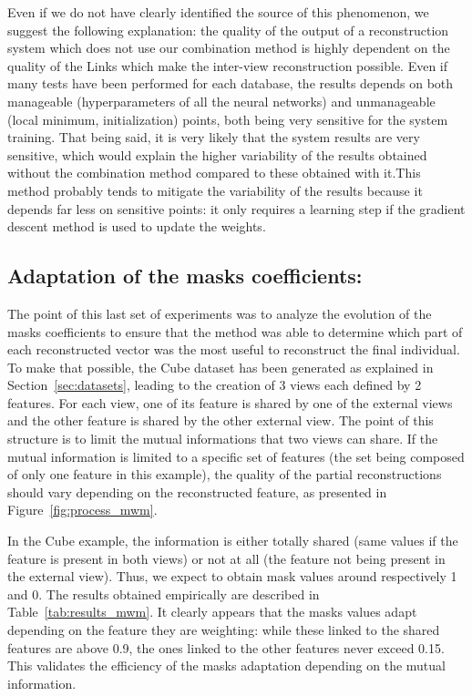 Even if we do not have clearly identified the source of this phenomenon, we suggest the following explanation: the quality of the output of a reconstruction system which does not use our combination method is highly dependent on the quality of the Links which make the inter-view reconstruction possible. Even if many tests have been performed for each database, the results depends on both manageable (hyperparameters of all the neural networks) and unmanageable (local minimum, initialization) points, both being very sensitive for the system training. That being said, it is very likely that the system results are very sensitive, which would explain the higher variability of the results obtained without the combination method compared to these obtained with it.\@ This method probably tends to mitigate the variability of the results because it depends far less on sensitive points: it only requires a learning step if the gradient descent method is used to update the weights.

\subsection{Adaptation of the masks coefficients:}
\label{sec:results_mwm}
The point of this last set of experiments was to analyze the evolution of the masks coefficients to ensure that the method was able to determine which part of each reconstructed vector was the most useful to reconstruct the final individual. To make that possible, the Cube dataset has been generated as explained in Section~\ref{sec:datasets}, leading to the creation of 3 views each defined by 2 features. For each view, one of its feature is shared by one of the external views and the other feature is shared by the other external view. The point of this structure is to limit the mutual informations that two views can share. If the mutual information is limited to a specific set of features (the set being composed of only one feature in this example), the quality of the partial reconstructions should vary depending on the reconstructed feature, as presented in Figure~\ref{fig:process_mwm}.

In the Cube example, the information is either totally shared (same values if the feature is present in both views) or not at all (the feature not being present in the external view). Thus, we expect to obtain mask values around respectively 1 and 0. The results obtained empirically are described in Table~\ref{tab:results_mwm}. It clearly appears that the masks values adapt depending on the feature they are weighting: while these linked to the shared features are above 0.9, the ones linked to the other features never exceed 0.15. This validates the efficiency of the masks adaptation depending on the mutual information. 

